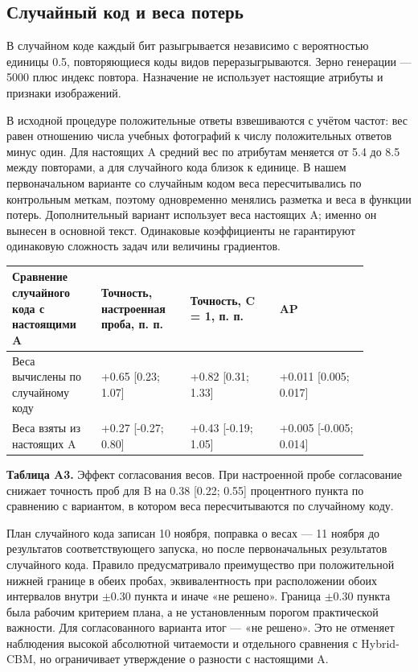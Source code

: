 \subsection{Случайный код и веса потерь}

В случайном коде каждый бит разыгрывается независимо с вероятностью единицы 0.5, повторяющиеся коды видов переразыгрываются. Зерно генерации — 5000 плюс индекс повтора. Назначение не использует настоящие атрибуты и признаки изображений.

В исходной процедуре положительные ответы взвешиваются с учётом частот: вес равен отношению числа учебных фотографий к числу положительных ответов минус один. Для настоящих A средний вес по атрибутам меняется от 5.4 до 8.5 между повторами, а для случайного кода близок к единице. В нашем первоначальном варианте со случайным кодом веса пересчитывались по контрольным меткам, поэтому одновременно менялись разметка и веса в функции потерь. Дополнительный вариант использует веса настоящих A; именно он вынесен в основной текст. Одинаковые коэффициенты не гарантируют одинаковую сложность задач или величины градиентов.

{\small\begin{longtable}{>{\raggedright\arraybackslash}p{0.221\linewidth}>{\raggedright\arraybackslash}p{0.221\linewidth}>{\raggedright\arraybackslash}p{0.221\linewidth}>{\raggedright\arraybackslash}p{0.221\linewidth}}\toprule
Сравнение случайного кода с настоящими A & Точность, настроенная проба, п. п. & Точность, C = 1, п. п. & AP\\\midrule\endhead
Веса вычислены по случайному коду & +0.65 [0.23; 1.07] & +0.82 [0.31; 1.33] & +0.011 [0.005; 0.017]\\
Веса взяты из настоящих A & +0.27 [-0.27; 0.80] & +0.43 [-0.19; 1.05] & +0.005 [-0.005; 0.014]\\
\bottomrule\end{longtable}}

\textbf{Таблица A3.} Эффект согласования весов. При настроенной пробе согласование снижает точность проб для B на 0.38 [0.22; 0.55] процентного пункта по сравнению с вариантом, в котором веса пересчитываются по случайному коду.

План случайного кода записан 10 ноября, поправка о весах — 11 ноября до результатов соответствующего запуска, но после первоначальных результатов случайного кода. Правило предусматривало преимущество при положительной нижней границе в обеих пробах, эквивалентность при расположении обоих интервалов внутри $\pm$0.30 пункта и иначе «не решено». Граница $\pm$0.30 пункта была рабочим критерием плана, а не установленным порогом практической важности. Для согласованного варианта итог — «не решено». Это не отменяет наблюдения высокой абсолютной читаемости и отдельного сравнения с Hybrid-CBM, но ограничивает утверждение о разности с настоящими A.

